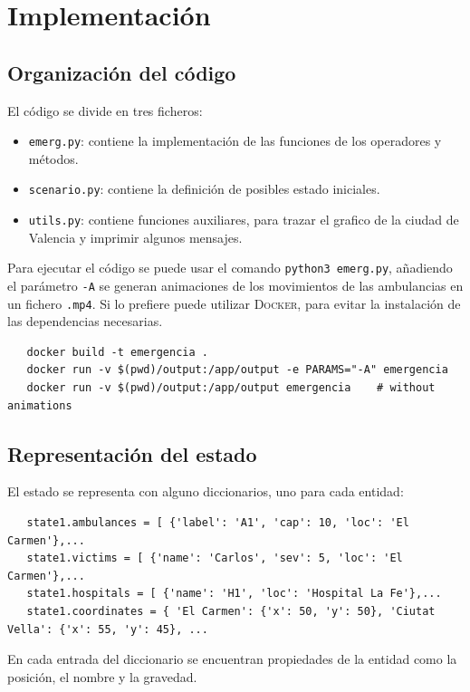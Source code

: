 \section{Implementación}

\subsection{Organización del código}
El código se divide en tres ficheros:
\begin{itemize}
   \item \texttt{emerg.py}: contiene la implementación de las funciones de los operadores y métodos.
   \item \texttt{scenario.py}: contiene la definición de posibles estado iniciales.
   \item \texttt{utils.py}: contiene funciones auxiliares, para trazar el grafico de la ciudad de Valencia y imprimir algunos mensajes.
\end{itemize}

Para ejecutar el código se puede usar el comando \texttt{python3 emerg.py}, añadiendo el parámetro \texttt{-A} se generan animaciones de los movimientos de las ambulancias en un fichero \texttt{.mp4}.
Si lo prefiere puede utilizar \textsc{Docker}, para evitar la instalación de las dependencias necesarias.

\begin{lstlisting}
   docker build -t emergencia .
   docker run -v $(pwd)/output:/app/output -e PARAMS="-A" emergencia
   docker run -v $(pwd)/output:/app/output emergencia    # without animations
\end{lstlisting}

\subsection{Representación del estado}
El estado se representa con alguno diccionarios, uno para cada entidad:
\begin{lstlisting}
   state1.ambulances = [ {'label': 'A1', 'cap': 10, 'loc': 'El Carmen'},...
   state1.victims = [ {'name': 'Carlos', 'sev': 5, 'loc': 'El Carmen'},...
   state1.hospitals = [ {'name': 'H1', 'loc': 'Hospital La Fe'},...
   state1.coordinates = { 'El Carmen': {'x': 50, 'y': 50}, 'Ciutat Vella': {'x': 55, 'y': 45}, ...
\end{lstlisting}
En cada entrada del diccionario se encuentran propiedades de la entidad como la posición, el nombre y la gravedad.

